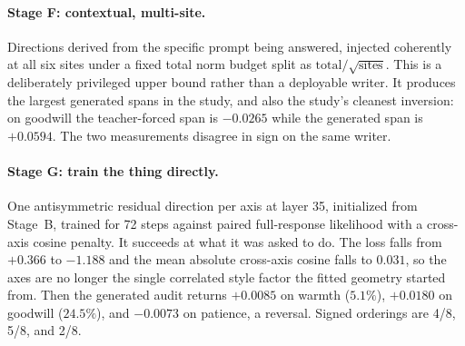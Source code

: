 \documentclass[10pt]{article}
\begin{document}
\paragraph{Stage F: contextual, multi-site.} Directions derived from the
specific prompt being answered, injected coherently at all six sites under a
fixed total norm budget split as $\text{total}/\sqrt{\text{sites}}$. This is a
deliberately privileged upper bound rather than a deployable writer. It produces
the largest generated spans in the study, and also the study's cleanest
inversion: on goodwill the teacher-forced span is $-0.0265$ while the generated
span is $+0.0594$. The two measurements disagree in sign on the same writer.

\paragraph{Stage G: train the thing directly.} One antisymmetric residual
direction per axis at layer 35, initialized from Stage~B, trained for 72 steps
against paired full-response likelihood with a cross-axis cosine penalty. It
succeeds at what it was asked to do. The loss falls from $+0.366$ to $-1.188$
and the mean absolute cross-axis cosine falls to $0.031$, so the axes are no
longer the single correlated style factor the fitted geometry started from.
Then the generated audit returns $+0.0085$ on warmth ($5.1\%$), $+0.0180$ on
goodwill ($24.5\%$), and $-0.0073$ on patience, a reversal. Signed orderings are
4/8, 5/8, and 2/8.
\end{document}
